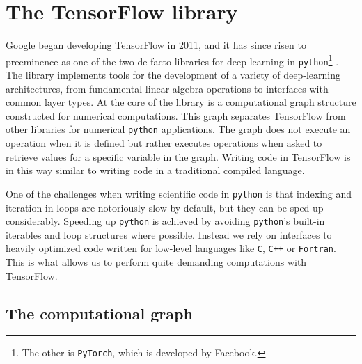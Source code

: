 \section{The TensorFlow library}\label{sec:TensorFlow}

Google began developing TensorFlow in 2011, and it has since risen to preeminence as one of the two de facto libraries for deep learning in \lstinline{python}\footnote{The other is \lstinline{PyTorch}, which is developed by Facebook.} \cite{tensorflow}. The library implements tools for the development of a variety of deep-learning architectures, from fundamental linear algebra operations to interfaces with common layer types. At the core of the library is a computational graph structure constructed for numerical computations. This graph separates TensorFlow from other libraries for numerical \lstinline{python} applications. The graph does not execute an operation when it is defined but rather executes operations when asked to retrieve values for a specific variable in the graph. Writing code in TensorFlow is in this way similar to writing code in a traditional compiled language.

One of the challenges when writing scientific code in \lstinline{python} is that indexing and iteration in loops are notoriously slow by default, but they can be sped up considerably. Speeding up \lstinline{python} is achieved by avoiding \lstinline{python}'s built-in iterables and loop structures where possible. Instead we rely on interfaces to heavily optimized code written for low-level languages like \lstinline{C}, \lstinline{C++} or \lstinline{Fortran}. This is what allows us to perform quite demanding computations with TensorFlow.

\subsection{The computational graph}

